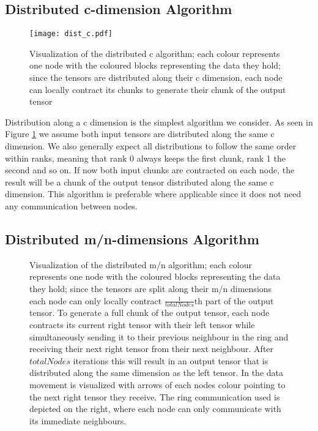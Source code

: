 \subsection{Distributed c-dimension Algorithm}

\begin{figure}[ht]
\centering\texttt{[image: dist\_c.pdf]}
\caption{Visualization of the distributed c algorithm; 
each colour represents one node with the coloured blocks representing the data they hold; 
since the tensors are distributed along their c dimension, each node can locally contract its chunks to generate their chunk of the output tensor}
\label{fig:c_algo}
\end{figure}

Distribution along a c dimension is the simplest algorithm we consider. 
As seen in Figure \ref{fig:c_algo} we assume both input tensors are distributed along the same c dimension.
We also generally expect all distributions to follow the same order within ranks, meaning that rank 0 always keeps the first chunk, rank 1 the second and so on.
If now both input chunks are contracted on each node, the result will be a chunk of the output tensor distributed along the same c dimension.
This algorithm is preferable where applicable since it does not need any communication between nodes.

\subsection{Distributed m/n-dimensions Algorithm}

\begin{figure}[ht]
\caption{Visualization of the distributed m/n algorithm; 
each colour represents one node with the coloured blocks representing the data they hold; 
since the tensors are split along their m/n dimensions each node can only locally contract $\frac{1}{totalNodes}$th part of the output tensor.
To generate a full chunk of the output tensor, each node contracts its current right tensor with their left tensor while simultaneously sending it to their previous neighbour in the ring and receiving their next right tensor from their next neighbour.
After $totalNodes$ iterations this will result in an output tensor that is distributed along the same dimension as the left tensor.
In the data movement is visualized with arrows of each nodes colour pointing to the next right tensor they receive.
The ring communication used is depicted on the right, where each node can only communicate with its immediate neighbours.
}
\label{fig:m_n_algo}
\end{figure}

